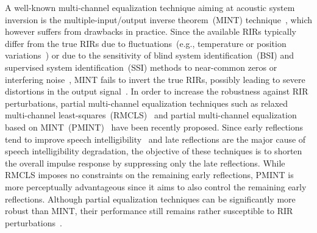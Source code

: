\documentclass[twocolumn]{bmcart}%
\begin{document}
A well-known multi-channel equalization technique aiming at acoustic system inversion is the multiple-input/output inverse theorem~(MINT) technique~\cite{Miyoshi_ITASS_1988}, which however suffers from drawbacks in practice. 
Since the available RIRs typically differ from the true RIRs due to fluctuations~(e.g., temperature or position variations~\cite{Radlovic_ITSA_2000}) or due to the sensitivity of blind system identification~(BSI) and supervised system identification~(SSI) methods to near-common zeros or interfering noise~\cite{Khong_ICASSP_2008,Haque_SPL_2008,Hu_EUSIPCO_2015}, MINT fails to invert the true RIRs, possibly leading to severe distortions in the output signal~\cite{Hikichi_EURASIP_2007,Kodrasi_ITASLP_2013,Lim_ITASLP_2014}.
In order to increase the robustness against RIR perturbations, partial multi-channel equalization techniques such as relaxed multi-channel least-squares~(RMCLS)~\cite{Lim_ITASLP_2014} and partial multi-channel equalization based on MINT~(PMINT)~\cite{Kodrasi_ITASLP_2013} have been recently proposed. 
Since early reflections tend to improve speech intelligibility~\cite{Arweiler_JASA_2011,Warzybok_JASA_2012} and late reflections are the major cause of speech intelligibility degradation, the objective of these techniques is to shorten the overall impulse response by suppressing only the late reflections.
While RMCLS imposes no constraints on the remaining early reflections, PMINT is more perceptually advantageous since it aims to also control the remaining early reflections.
Although partial equalization techniques can be significantly more robust than MINT, their performance still remains rather susceptible to RIR perturbations~\cite{Lim_ITASLP_2014,Kodrasi_ITASLP_2013}.
\end{document}
